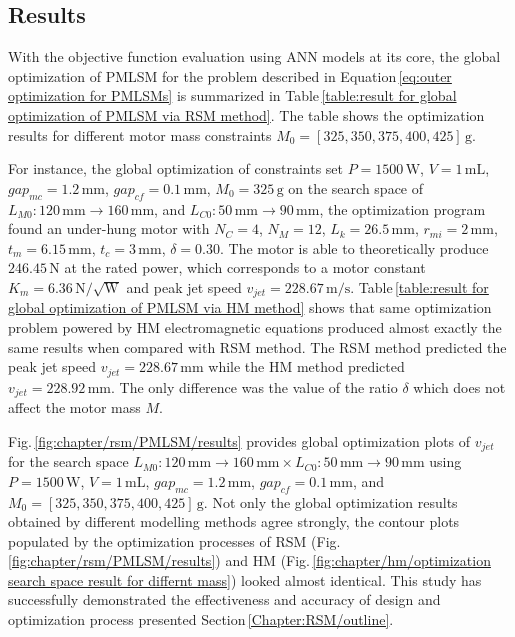         \subsection{Results}                   \label{Chapter:RSM/PMLSM/Results}


            With the objective function evaluation using \acs{ANN} models at its core, the global optimization of \acs{PMLSM} for the problem described in Equation\,\ref{eq:outer optimization for PMLSMs} is summarized in Table\,\ref{table:result for global optimization of PMLSM via RSM method}. The table shows the optimization results for different motor mass constraints $M_0=[325,350,375,400,425]\,\mathrm{g}$.
            
            
            For instance, the global optimization of constraints set $P=1500\,\mathrm{W}$, $V=1\,\mathrm{mL}$, $gap_{mc}=1.2\,\mathrm{mm}$, $gap_{cf}=0.1\,\mathrm{mm}$, $M_0=325\,\mathrm{g}$ on the search space of $L_{M0}:120\,\mathrm{mm}\rightarrow 160\,\mathrm{mm}$, and $L_{C0}:50\,\mathrm{mm}\rightarrow 90\,\mathrm{mm}$, the optimization program found an under-hung motor with $N_C=4$, $N_M=12$, $L_k=26.5\,\mathrm{mm}$, $r_{mi}=2\,\mathrm{mm}$, $t_m=6.15\,\mathrm{mm}$, $t_c=3\,\mathrm{mm}$, $\delta=0.30$. The motor is able to theoretically produce $246.45\,\mathrm{N}$ at the rated power, which corresponds to a motor constant $K_m=6.36\,\mathrm{N/\sqrt{W}}$ and peak jet speed $v_{jet}=228.67\,\mathrm{m/s}$. Table\,\ref{table:result for global optimization of PMLSM via HM method} shows that same optimization problem powered by \acs{HM} electromagnetic equations produced almost exactly the same results when compared with \acs{RSM} method. The \acs{RSM} method predicted the peak jet speed $v_{jet}=228.67\,\mathrm{mm}$ while the \acs{HM} method predicted $v_{jet}=228.92\,\mathrm{mm}$. The only difference was the value of the ratio $\delta$ which does not affect the motor mass $M$.  
            
            
            Fig.\,\ref{fig:chapter/rsm/PMLSM/results} provides global optimization plots of $v_{jet}$ for the search space $L_{M0}:120\,\mathrm{mm}\rightarrow 160\,\mathrm{mm} \times L_{C0}:50\,\mathrm{mm}\rightarrow 90\,\mathrm{mm}$ using $P=1500\,\mathrm{W}$, $V=1\,\mathrm{mL}$, $gap_{mc}=1.2\,\mathrm{mm}$, $gap_{cf}=0.1\,\mathrm{mm}$,  and $M_0=[325,350,375,400,425]\,\mathrm{g}$. Not only the global optimization results obtained by different modelling methods agree strongly, the contour plots populated by the optimization processes of \acs{RSM} (Fig.\,\ref{fig:chapter/rsm/PMLSM/results}) and \acs{HM} (Fig.\,\ref{fig:chapter/hm/optimization search space result for differnt mass}) looked almost identical. This study has successfully demonstrated the effectiveness and accuracy of design and optimization process presented Section\,\ref{Chapter:RSM/outline}.
        

